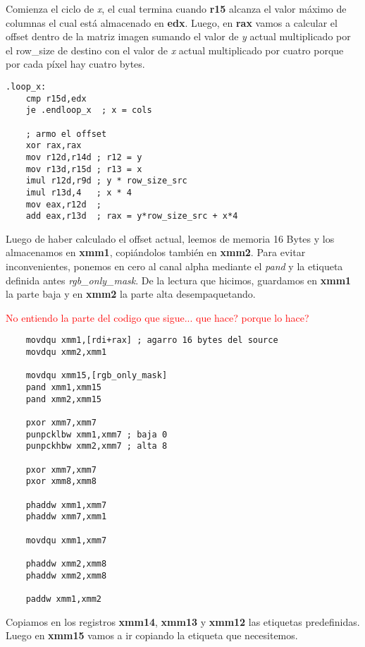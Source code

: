 \documentclass[a4paper]{article}
\begin{document}
\indent Comienza el ciclo de \emph{x}, el cual termina cuando \textbf{r15} alcanza el valor m\'aximo de columnas el cual est\'a almacenado en \textbf{edx}. Luego, en \textbf{rax} vamos a calcular el offset dentro de la matriz imagen sumando el valor de \emph{y} actual multiplicado por el row_size de destino con el valor de \emph{x} actual multiplicado por cuatro porque por cada p\'ixel hay cuatro bytes.
\begin{codesnippet}
\begin{verbatim}
.loop_x:
    cmp r15d,edx
    je .endloop_x  ; x = cols

    ; armo el offset
    xor rax,rax
    mov r12d,r14d ; r12 = y
    mov r13d,r15d ; r13 = x
    imul r12d,r9d ; y * row_size_src
    imul r13d,4   ; x * 4 
    mov eax,r12d  ; 
    add eax,r13d  ; rax = y*row_size_src + x*4 
\end{verbatim}
\end{codesnippet}

\indent Luego de haber calculado el offset actual, leemos de memoria 16 Bytes y los almacenamos en \textbf{xmm1}, copi\'andolos tambi\'en en \textbf{xmm2}. Para evitar inconvenientes, ponemos en cero al canal alpha mediante el \textit{pand} y la etiqueta definida antes \textit{rgb_only_mask}. De la lectura que hicimos, guardamos en \textbf{xmm1} la parte baja y en \textbf{xmm2} la parte alta desempaquetando.

\textcolor{red}{No entiendo la parte del codigo que sigue... que hace? porque lo hace?}
\begin{codesnippet}
\begin{verbatim}
    movdqu xmm1,[rdi+rax] ; agarro 16 bytes del source
    movdqu xmm2,xmm1

    movdqu xmm15,[rgb_only_mask]
    pand xmm1,xmm15
    pand xmm2,xmm15

    pxor xmm7,xmm7
    punpcklbw xmm1,xmm7 ; baja 0
    punpckhbw xmm2,xmm7 ; alta 8

    pxor xmm7,xmm7
    pxor xmm8,xmm8

    phaddw xmm1,xmm7
    phaddw xmm7,xmm1 
    
    movdqu xmm1,xmm7

    phaddw xmm2,xmm8
    phaddw xmm2,xmm8

    paddw xmm1,xmm2
\end{verbatim}
\end{codesnippet}

\indent Copiamos en los registros \textbf{xmm14}, \textbf{xmm13} y \textbf{xmm12} las etiquetas predefinidas. Luego en \textbf{xmm15} vamos a ir copiando la etiqueta que necesitemos.
\end{document}
